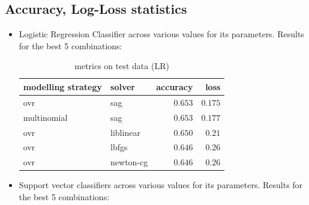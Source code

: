 \documentclass[fleqn,10pt]{SelfArx} %
\begin{document}
\subsection{Accuracy, Log-Loss statistics}
\begin{itemize}
\item Logistic Regression Classifier across various values for its parameters. Results for the best 5 combinations:
  \begin{table}[H]
    \caption{metrics on test data (LR)}
    \centering
    \begin{tabular}{llrr}
      \toprule
      modelling strategy & solver & accuracy & loss \\
      \midrule
      ovr & sag & $0.653$ & $0.175$ \\
      multinomial & sag & $0.653$ & $0.177$ \\
      ovr & liblinear & $0.650$ & $0.21$ \\
      ovr & lbfgs & $0.646$ & $0.26$ \\
      ovr & newton-cg & $0.646$ & $0.26$ \\
      \bottomrule
    \end{tabular}
  \end{table}

\item Support vector classifiers across various values for its parameters. Results for the best 5 combinations:


\end{itemize}
\end{document}
